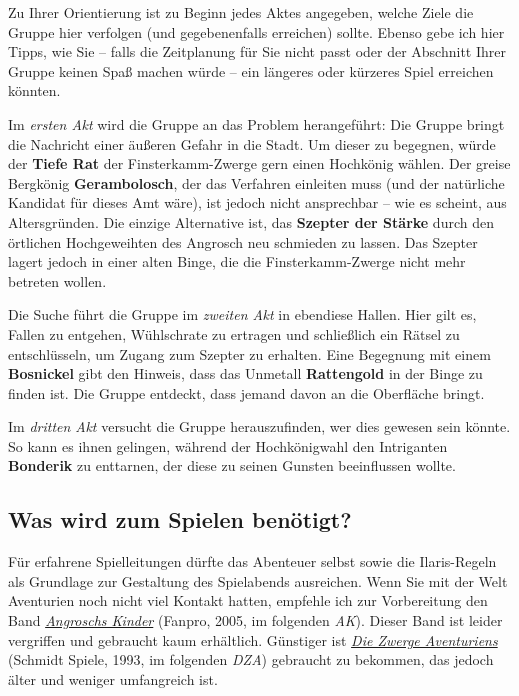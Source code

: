 Zu Ihrer Orientierung ist zu Beginn jedes Aktes angegeben, welche Ziele die Gruppe hier verfolgen (und gegebenenfalls erreichen) sollte.
Ebenso gebe ich hier Tipps, wie Sie -- falls die Zeitplanung für Sie nicht passt  oder der Abschnitt Ihrer Gruppe keinen Spaß machen würde -- ein längeres oder kürzeres Spiel erreichen könnten.

Im \emph{ersten Akt} wird die Gruppe an das Problem herangeführt:
Die Gruppe bringt die Nachricht einer äußeren Gefahr in die Stadt.
Um dieser zu begegnen, würde der \textbf{Tiefe Rat} der Finsterkamm-Zwerge gern einen Hochkönig wählen.
Der greise Bergkönig \textbf{Gerambolosch}, der das Verfahren einleiten muss (und der natürliche Kandidat für dieses Amt wäre), ist jedoch nicht ansprechbar -- wie es scheint, aus Altersgründen.
Die einzige Alternative ist, das \textbf{Szepter der Stärke} durch den örtlichen Hochgeweihten des Angrosch neu schmieden zu lassen.
Das Szepter lagert jedoch in einer alten Binge, die die Finsterkamm-Zwerge nicht mehr betreten wollen.


Die Suche führt die Gruppe im \emph{zweiten Akt} in ebendiese Hallen.
Hier gilt es, Fallen zu entgehen, Wühlschrate zu ertragen und schließlich ein Rätsel zu entschlüsseln, um Zugang zum Szepter zu erhalten.
Eine Begegnung mit einem \textbf{Bosnickel} gibt den Hinweis, dass das Unmetall \textbf{Rattengold} in der Binge zu finden ist.
Die Gruppe entdeckt, dass jemand davon an die Oberfläche bringt.

Im \emph{dritten Akt} versucht die Gruppe herauszufinden, wer dies gewesen sein könnte.
So kann es ihnen gelingen, während der Hochkönigwahl den Intriganten \textbf{Bonderik} zu enttarnen,
der diese zu seinen Gunsten beeinflussen wollte.

\subsection*{Was wird zum Spielen benötigt?}
Für erfahrene Spielleitungen dürfte das Abenteuer selbst sowie die Ilaris-Regeln als Grundlage zur Gestaltung des Spielabends ausreichen.
Wenn Sie mit der Welt Aventurien noch nicht viel Kontakt hatten, empfehle ich zur Vorbereitung den Band \emph{\href{https://de.wiki-aventurica.de/wiki/Angroschs_Kinder}{Angroschs Kinder}} (Fanpro, 2005, im folgenden \emph{AK}).
Dieser Band ist leider vergriffen und gebraucht kaum erhältlich.
Günstiger ist \emph{\href{https://de.wiki-aventurica.de/de/index.php?title=Die_Zwerge_Aventuriens&redirect=no}{Die Zwerge Aventuriens}} (Schmidt Spiele, 1993, im folgenden \emph{DZA}) gebraucht zu bekommen,
das jedoch älter und weniger umfangreich ist.

